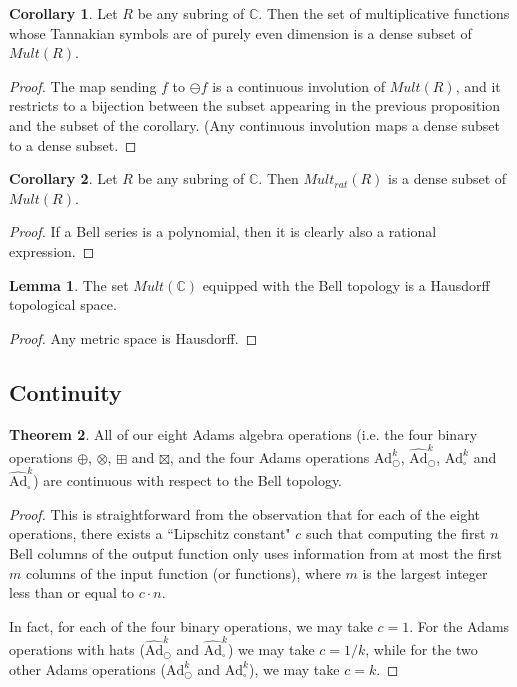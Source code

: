 \documentclass[a4paper]{article}
\theoremstyle{definition}
\newtheorem{theorem}{Theorem}[section]
\newtheorem{lemma}[theorem]{Lemma}
\newtheorem*{corollary}{Corollary}
\theoremstyle{remark}
\newcommand{\adam}[1]{\text{Ad}^{#1}_{\bigcirc}}
\newcommand{\hatadam}[1]{\widehat{\text{Ad}}^{#1}_{\bigcirc}}
\newcommand{\boxadam}[1]{\text{Ad}^{#1}_{\square}}
\newcommand{\hatboxadam}[1]{\widehat{\text{Ad}}^{#1}_{\square}}
\newcommand{\C}{\mathbb{C}}
\begin{document}
\begin{corollary}
Let $R$ be any subring of $\C$. Then the set of multiplicative functions whose Tannakian symbols are of purely even dimension is a dense subset of $Mult(R)$. 
\end{corollary}

\begin{proof}
The map sending $f$ to $\ominus f$ is a continuous involution of $Mult(R)$, and it restricts to a bijection between the subset appearing in the previous proposition and the subset of the corollary. (Any continuous involution maps a dense subset to a dense subset.
\end{proof}

\begin{corollary}
Let $R$ be any subring of $\C$. Then $Mult_{rat}(R)$ is a dense subset of $Mult(R)$. 
\end{corollary}

\begin{proof}
If a Bell series is a polynomial, then it is clearly also a rational expression.
\end{proof}

\begin{lemma}
The set $Mult(\C)$ equipped with the Bell topology is a Hausdorff topological space.
\end{lemma}
\begin{proof}
Any metric space is Hausdorff.
\end{proof}

\subsection{Continuity}


\begin{theorem} \label{AdamsAlgebraContinuity}
All of our eight Adams algebra operations (i.e. the four binary operations $\oplus$, $\otimes$, $\boxplus$ and $\boxtimes$, and the four Adams operations $\adam{k}$, $\hatadam{k}$, $\boxadam{k}$ and $\hatboxadam{k}$) are continuous with respect to the Bell topology.
\end{theorem}
\begin{proof}
This is straightforward from the observation that for each of the eight operations, there exists a ``Lipschitz constant" $c$ such that computing the first $n$ Bell columns of the output function only uses information from at most the first $m$ columns of the input function (or functions), where $m$ is the largest integer less than or equal to $c \cdot n$. 

In fact, for each of the four binary operations, we may take $c=1$. For the Adams operations with hats ($\hatadam{k}$ and $\hatboxadam{k}$) we may take $c= 1/k$, while for the two other Adams operations ($\adam{k}$ and $\boxadam{k}$), we may take $c=k$.
\end{proof}
\end{document}
